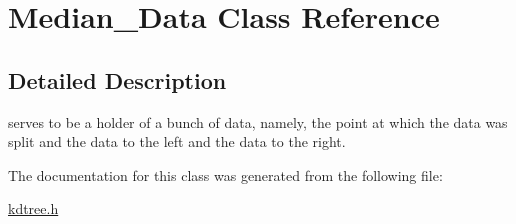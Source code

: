 \hypertarget{classMedian__Data}{}\section{Median\+\_\+\+Data Class Reference}
\label{classMedian__Data}


\subsection{Detailed Description}
serves to be a holder of a bunch of data, namely, the point at which the data was split and the data to the left and the data to the right. 

The documentation for this class was generated from the following file\+:\begin{DoxyCompactItemize}
\item 
\hyperlink{kdtree_8h}{kdtree.\+h}\end{DoxyCompactItemize}
